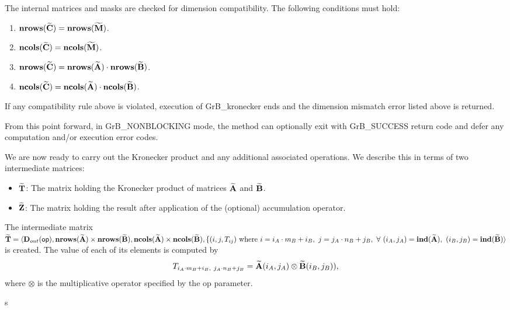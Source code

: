 The internal matrices and masks are checked for dimension compatibility. The following
conditions must hold:
\begin{enumerate}
	\item $\bold{nrows}({\bf \widetilde{C}}) = \bold{nrows}({\bf \widetilde{M}})$.

	\item $\bold{ncols}({\bf \widetilde{C}}) = \bold{ncols}({\bf \widetilde{M}})$.

	\item $\bold{nrows}({\bf \widetilde{C}}) = \bold{nrows}({\bf \widetilde{A}}) \cdot \bold{nrows}({\bf \widetilde{B}})$.

	\item $\bold{ncols}({\bf \widetilde{C}}) = \bold{ncols}({\bf \widetilde{A}}) \cdot \bold{ncols}({\bf \widetilde{B}})$.
\end{enumerate}
If any compatibility rule above is violated, execution of {\sf GrB\_kronecker} ends and
the dimension mismatch error listed above is returned.

From this point forward, in {\sf GrB\_NONBLOCKING} mode, the method can 
optionally exit with {\sf GrB\_SUCCESS} return code and defer any computation 
and/or execution error codes.

We are now ready to carry out the Kronecker product and any additional 
associated operations.  We describe this in terms of two intermediate matrices:
\begin{itemize}
    \item ${\bf \widetilde{T}}$: The matrix holding the Kronecker product of matrices 
    ${\bf \widetilde{A}}$ and ${\bf \widetilde{B}}$.
    \item ${\bf \widetilde{Z}}$: The matrix holding the result after 
    application of the (optional) accumulation operator.
\end{itemize}

The intermediate matrix ${\bf \widetilde{T}} = \langle
\mbox{$\mathbf{D}_{out}$}({\sf op}), 
\bold{nrows}({\bf \widetilde{A}}) \times \bold{nrows}({\bf \widetilde{B}}), 
\bold{ncols}({\bf \widetilde{A}}) \times \bold{ncols}({\bf \widetilde{B}}),
\{(i,j,T_{ij}) \text{~where~} i = i_A \cdot m_B + i_B, ~ j = j_A \cdot n_B + j_B, ~ \forall ~
(i_A, j_A) = \bold{ind}({\bf \widetilde{A}}), ~
(i_B, j_B) = \bold{ind}({\bf \widetilde{B}}) \rangle$
is created.  The value of each of its elements is computed by 
\[T_{i_A \cdot m_B + i_B,~ j_A \cdot n_B + j_B} = {\bf \widetilde{A}}(i_A,j_A) \otimes
{\bf \widetilde{B}}(i_B,j_B)),\] where $\otimes$ is the multiplicative 
operator specified by the {\sf op} parameter.




s

